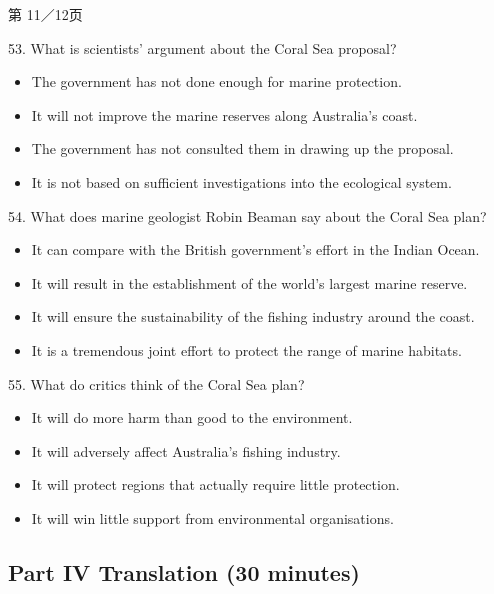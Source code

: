 \documentclass[UTF8,11pt]{ctexart}
\begin{document}
第 11／12页


53. What is scientists' argument about the Coral Sea proposal?


\begin{itemize}[leftmargin=2em,itemsep=.2em,topsep=.4em]\item[A.] The government has not done enough for marine protection.
\item[B.] It will not improve the marine reserves along Australia's coast.
\item[C.] The government has not consulted them in drawing up the proposal.
\item[D.] It is not based on sufficient investigations into the ecological system.
\end{itemize}

54. What does marine geologist Robin Beaman say about the Coral Sea plan?


\begin{itemize}[leftmargin=2em,itemsep=.2em,topsep=.4em]\item[A.] It can compare with the British government's effort in the Indian Ocean.
\item[B.] It will result in the establishment of the world's largest marine reserve.
\item[C.] It will ensure the sustainability of the fishing industry around the coast.
\item[D.] It is a tremendous joint effort to protect the range of marine habitats.
\end{itemize}

55. What do critics think of the Coral Sea plan?


\begin{itemize}[leftmargin=2em,itemsep=.2em,topsep=.4em]\item[A.] It will do more harm than good to the environment.
\item[B.] It will adversely affect Australia's fishing industry.
\item[C.] It will protect regions that actually require little protection.
\item[D.] It will win little support from environmental organisations.
\end{itemize}

\subsection*{\textbf{Part IV} \textbf{Translation} \textbf{(30 minutes)}}
\end{document}
